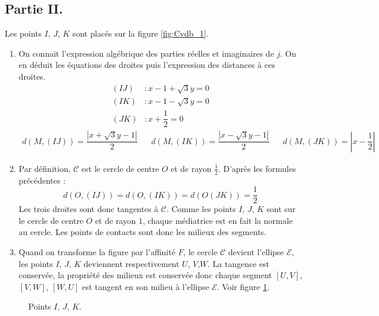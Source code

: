 \subsection*{Partie II.}
Les points $I$, $J$, $K$ sont placés sur la figure \ref{fig:Cvdb_1}.
\begin{enumerate}
 \item On connait l'expression algébrique des parties réelles et imaginaires de $j$. On en déduit les équations des droites puis l'expression des distances à ces droites.
\begin{align*}
 (IJ) &: x-1 + \sqrt{3}y = 0  \\
 (IK) &: x-1 - \sqrt{3}y = 0  \\
 (JK) &: x+\dfrac{1}{2} = 0
\end{align*}
\begin{align*}
 d(M,(IJ)) = \dfrac{|x+\sqrt{3}y-1|}{2} & &
d(M,(IK)) = \dfrac{|x-\sqrt{3}y-1|}{2} & &
d(M,(JK)) = |x - \dfrac{1}{2}|
\end{align*}
\item Par définition, $\mathcal C$ est le cercle de centre $O$ et de rayon $\frac{1}{2}$. D'après les formules précédentes :
\begin{displaymath}
 d(O,(IJ))=d(O,(IK))=d(O(JK))=\dfrac{1}{2}
\end{displaymath}
Les trois droites sont donc tangentes à $\mathcal C$. Comme les points $I$, $J$, $K$ sont sur le cercle de centre $O$ et de rayon $1$, chaque médiatrice est en fait la normale au cercle. Les points de contacts sont donc les milieux des segments.
\item Quand on transforme la figure par l'affinité $F$, le cercle $\mathcal C$ devient l'ellipse 
$\mathcal E$, les points $I$, $J$, $K$ deviennent respectivement $U$, $V$,$W$. La tangence est conservée, la propriété des milieux est conservée donc chaque segment $[U,V]$, $[V,W]$, $[W,U]$ est tangent en son milieu à l'ellipse $\mathcal E$. Voir figure \ref{fig:Cvdb_2}.
\end{enumerate}
\begin{figure}[ht]
 \centering

\caption{Points $I$, $J$, $K$.}
\label{fig:Cvdb_2}
\end{figure}

